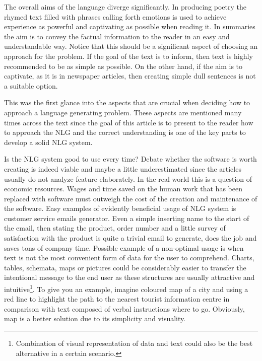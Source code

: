 The overall aims of the language diverge significantly. In producing poetry the rhymed text filled with phrases calling forth emotions is used to achieve experience as powerful and captivating as possible when reading it. In summaries the aim is to convey the factual information to the reader in an easy and understandable way. Notice that this should be a significant aspect of choosing an approach for the problem. If the goal of the text is to inform, then text is highly recommended to be as simple as possible. On the other hand, if the aim is to captivate, as it is in newspaper articles, then creating simple dull sentences is not a suitable option. 

This was the first glance into the aspects that are crucial when deciding how to approach a language generating problem. These aspects are mentioned many times across the text since the goal of this article is to present to the reader how to approach the NLG and the correct understanding is one of the key parts to develop a solid NLG system.

Is the NLG system good to use every time? Debate whether the software is worth creating is indeed viable and maybe a little underestimated since the articles usually do not analyze feature elaborately. In the real world this is a question of economic resources. Wages and time saved on the human work that has been replaced with software must outweigh the cost of the creation and maintenance of the software. Easy examples of evidently beneficial usage of NLG system is customer service emails generator. Even a simple inserting name to the start of the email, then stating the product, order number and a little survey of satisfaction with the product is quite a trivial email to generate, does the job and saves tons of company time. Possible example of a non-optimal usage is when text is not the most convenient form of data for the user to comprehend. Charts, tables, schemata, maps or pictures could be considerably easier to transfer the intentional message to the end user as these structures are usually attractive and intuitive\footnote{Combination of visual representation of data and text could also be the best alternative in a certain scenario.}. To give you an example, imagine coloured map of a city and using a red line to highlight the path to the nearest tourist information centre in comparison with text composed of verbal instructions where to go. Obviously, map is a better solution due to its simplicity and visuality. 

